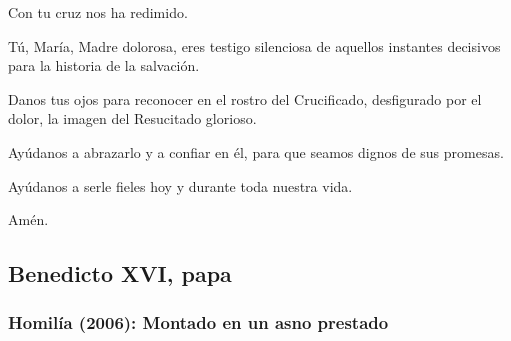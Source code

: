 \begin{body}
\begin{bodyprose}
Con tu cruz nos ha redimido.

Tú, María, Madre dolorosa,
   eres testigo silenciosa
   de aquellos instantes decisivos
   para la historia de la salvación.

Danos tus ojos para reconocer
   en el rostro del Crucificado,
   desfigurado por el dolor,
   la imagen del Resucitado glorioso.

Ayúdanos a abrazarlo
   y a confiar en él,
   para que seamos dignos de sus promesas.

Ayúdanos a serle fieles hoy
   y durante toda nuestra vida. 

Amén.
\end{bodyprose}
\end{body}


\newsection
\subsection{Benedicto XVI, papa}

\subsubsection{Homilía (2006): Montado en un asno prestado}


